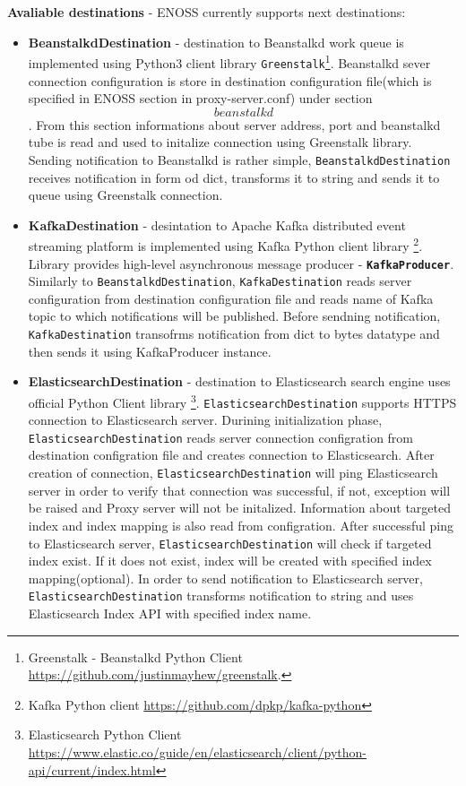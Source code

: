     \textbf{Avaliable destinations} - ENOSS currently supports next destinations:
    \begin{itemize}
        \item \textbf{BeanstalkdDestination} - destination to Beanstalkd work queue is implemented using Python3 client library \texttt{Greenstalk}\footnote{Greenstalk - Beanstalkd Python Client \url{https://github.com/justinmayhew/greenstalk}.}. Beanstalkd sever connection configuration is store in destination configuration file(which is specified in ENOSS section in proxy-server.conf) under section \texttt{\[beanstalkd\]}. From this section informations about server address, port and beanstalkd tube is read and used to initalize connection using Greenstalk library. Sending notification to Beanstalkd is rather simple, \texttt{BeanstalkdDestination} receives notification in form od dict, transforms it to string and sends it to queue using Greenstalk connection.

        \item \textbf{KafkaDestination} - desintation to Apache Kafka distributed event streaming platform is implemented using Kafka Python client library \footnote{Kafka Python client \url{https://github.com/dpkp/kafka-python}}. Library provides high-level asynchronous message producer - \textbf{\texttt{KafkaProducer}}. Similarly to \texttt{BeanstalkdDestination}, \texttt{KafkaDestination} reads server configuration from destination configuration file and reads name of Kafka topic to which notifications will be published. Before sendning notification, \texttt{KafkaDestination} transofrms notification from dict to bytes datatype and then sends it using KafkaProducer instance.

        \item \textbf{ElasticsearchDestination} - destination to Elasticsearch search engine uses official Python Client library \footnote{Elasticsearch Python Client \url{https://www.elastic.co/guide/en/elasticsearch/client/python-api/current/index.html}}. \texttt{ElasticsearchDestination} supports HTTPS connection to Elasticsearch server. Durining initialization phase, \texttt{ElasticsearchDestination} reads server connection configration from destination configration file and creates connection to Elasticsearch. After creation of connection, \texttt{ElasticsearchDestination} will ping Elasticsearch server in order to verify that connection was successful, if not, exception will be raised and Proxy server will not be initalized. Information about targeted index and index mapping is also read from configration. After successful ping to Elasticsearch server, \texttt{ElasticsearchDestination} will check if targeted index exist. If it does not exist, index will be created with specified index mapping(optional). In order to send notification to Elasticsearch server, \texttt{ElasticsearchDestination} transforms notification to string and uses Elasticsearch Index API with specified index name.
    \end{itemize}

